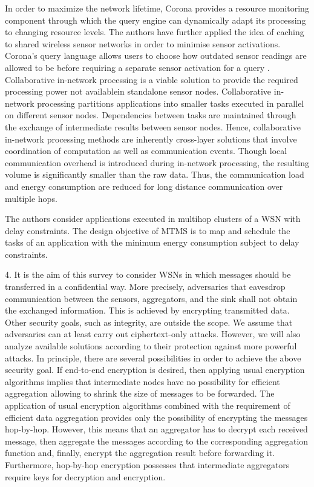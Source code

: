 In order to maximize the network lifetime, Corona provides a resource monitoring component through which the query engine can dynamically adapt its processing to changing resource levels. The authors have further applied the idea of caching to shared wireless sensor networks in order to minimise sensor activations. Corona’s query language allows users to choose how outdated sensor readings are allowed to be before requiring a separate sensor activation for a query
. Collaborative in-network processing is a viable solution to provide the required processing power not availablein standalone sensor nodes. Collaborative in-network processing partitions applications into smaller tasks executed in parallel on different sensor nodes. Dependencies between tasks are maintained through the exchange of intermediate results between sensor nodes. Hence, collaborative in-network processing methods are inherently cross-layer solutions that involve coordination of computation as well as communication events. Though local communication overhead is introduced during in-network processing, the resulting volume is significantly smaller than the raw data. Thus, the communication load and energy consumption are reduced for long distance communication over multiple hops.
\smallskip

The authors consider applications executed in multihop clusters of a WSN with delay constraints. The design objective of MTMS is to map and schedule the tasks of an application with the minimum energy consumption subject to delay constraints.
\smallskip

4. It is the aim of this survey to consider WSNs in which messages should be transferred in a confidential way. More precisely, adversaries that eavesdrop communication between the sensors, aggregators, and the sink shall not obtain the exchanged information. This is achieved by encrypting transmitted data. Other security goals, such as integrity, are outside the scope. We assume that adversaries can at least carry out ciphertext-only attacks. However, we will also analyze available solutions according to their protection against more powerful attacks. In principle, there are several possibilities in order to achieve the above security goal. If end-to-end encryption is desired, then applying usual encryption algorithms implies that intermediate nodes have no possibility for efficient aggregation allowing to shrink the size of messages to be forwarded. The application of usual encryption algorithms combined with the requirement of efficient data aggregation provides only the possibility of encrypting the messages hop-by-hop. However, this means that an aggregator has to decrypt each received message, then aggregate the messages according to the corresponding aggregation function and, finally, encrypt the aggregation result before forwarding it. Furthermore, hop-by-hop encryption possesses that intermediate aggregators require keys for decryption and encryption.
\smallskip

